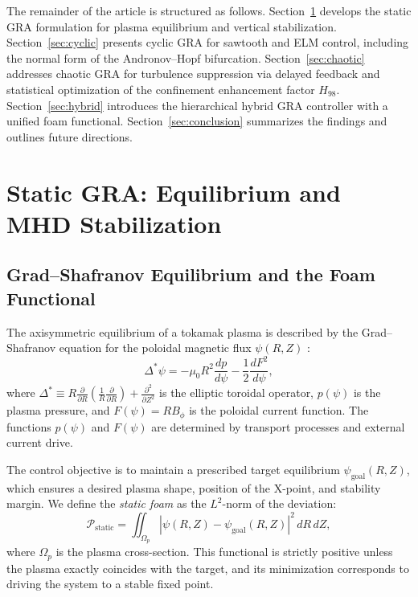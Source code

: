 \documentclass[12pt,a4paper]{article}
\begin{document}
The remainder of the article is structured as follows. Section~\ref{sec:static} develops the static GRA formulation for plasma equilibrium and vertical stabilization. Section~\ref{sec:cyclic} presents cyclic GRA for sawtooth and ELM control, including the normal form of the Andronov--Hopf bifurcation. Section~\ref{sec:chaotic} addresses chaotic GRA for turbulence suppression via delayed feedback and statistical optimization of the confinement enhancement factor $H_{98}$. Section~\ref{sec:hybrid} introduces the hierarchical hybrid GRA controller with a unified foam functional. Section~\ref{sec:conclusion} summarizes the findings and outlines future directions.

\section{Static GRA: Equilibrium and MHD Stabilization}
\label{sec:static}

\subsection{Grad--Shafranov Equilibrium and the Foam Functional}

The axisymmetric equilibrium of a tokamak plasma is described by the Grad--Shafranov equation for the poloidal magnetic flux $\psi(R,Z)$ \cite{Wesson2011}:
\begin{equation}
\Delta^* \psi = -\mu_0 R^2 \frac{dp}{d\psi} - \frac{1}{2} \frac{dF^2}{d\psi},
\label{eq:GS}
\end{equation}
where $\Delta^* \equiv R\frac{\partial}{\partial R}\left(\frac{1}{R}\frac{\partial}{\partial R}\right) + \frac{\partial^2}{\partial Z^2}$ is the elliptic toroidal operator, $p(\psi)$ is the plasma pressure, and $F(\psi) = R B_\phi$ is the poloidal current function. The functions $p(\psi)$ and $F(\psi)$ are determined by transport processes and external current drive.

The control objective is to maintain a prescribed target equilibrium $\psi_{\text{goal}}(R,Z)$, which ensures a desired plasma shape, position of the X-point, and stability margin. We define the \textit{static foam} as the $L^2$-norm of the deviation:
\begin{equation}
\mathcal{P}_{\text{static}} = \iint_{\Omega_p} \left| \psi(R,Z) - \psi_{\text{goal}}(R,Z) \right|^2 \, dR\, dZ,
\label{eq:Pstatic}
\end{equation}
where $\Omega_p$ is the plasma cross-section. This functional is strictly positive unless the plasma exactly coincides with the target, and its minimization corresponds to driving the system to a stable fixed point.
\end{document}
